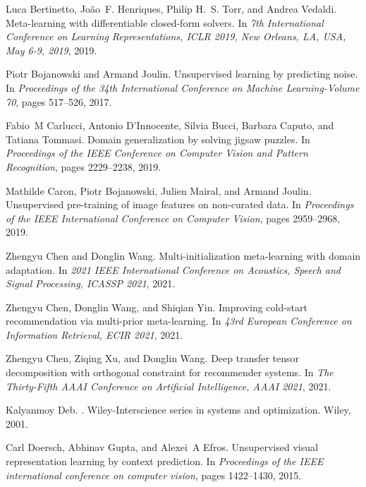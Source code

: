 \documentclass[final]{cvpr}
\begin{document}
\begin{thebibliography}{10}\itemsep=-1pt
	
	Luca Bertinetto, Jo{\~{a}}o~F. Henriques, Philip H.~S. Torr, and Andrea
	Vedaldi.
	\newblock Meta-learning with differentiable closed-form solvers.
	\newblock In {\em 7th International Conference on Learning Representations,
		{ICLR} 2019, New Orleans, LA, USA, May 6-9, 2019}, 2019.
	
	Piotr Bojanowski and Armand Joulin.
	\newblock Unsupervised learning by predicting noise.
	\newblock In {\em Proceedings of the 34th International Conference on Machine
		Learning-Volume 70}, pages 517--526, 2017.
	
	Fabio~M Carlucci, Antonio D'Innocente, Silvia Bucci, Barbara Caputo, and
	Tatiana Tommasi.
	\newblock Domain generalization by solving jigsaw puzzles.
	\newblock In {\em Proceedings of the IEEE Conference on Computer Vision and
		Pattern Recognition}, pages 2229--2238, 2019.
	
	Mathilde Caron, Piotr Bojanowski, Julien Mairal, and Armand Joulin.
	\newblock Unsupervised pre-training of image features on non-curated data.
	\newblock In {\em Proceedings of the IEEE International Conference on Computer
		Vision}, pages 2959--2968, 2019.
	
	Zhengyu Chen and Donglin Wang.
	\newblock Multi-initialization meta-learning with domain adaptation.
	\newblock In {\em 2021 {IEEE} International Conference on Acoustics, Speech and
		Signal Processing, {ICASSP} 2021}, 2021.
	
	Zhengyu Chen, Donglin Wang, and Shiqian Yin.
	\newblock Improving cold-start recommendation via multi-prior meta-learning.
	\newblock In {\em 43rd European Conference on Information Retrieval, {ECIR}
		2021}, 2021.
	
	Zhengyu Chen, Ziqing Xu, and Donglin Wang.
	\newblock Deep transfer tensor decomposition with orthogonal constraint for
	recommender systems.
	\newblock In {\em The Thirty-Fifth {AAAI} Conference on Artificial
		Intelligence, {AAAI} 2021}, 2021.
	
	Kalyanmoy Deb.
	.
	\newblock Wiley-Interscience series in systems and optimization. Wiley, 2001.
	
	Carl Doersch, Abhinav Gupta, and Alexei~A Efros.
	\newblock Unsupervised visual representation learning by context prediction.
	\newblock In {\em Proceedings of the IEEE international conference on computer
		vision}, pages 1422--1430, 2015.
	

\end{thebibliography}
\end{document}
